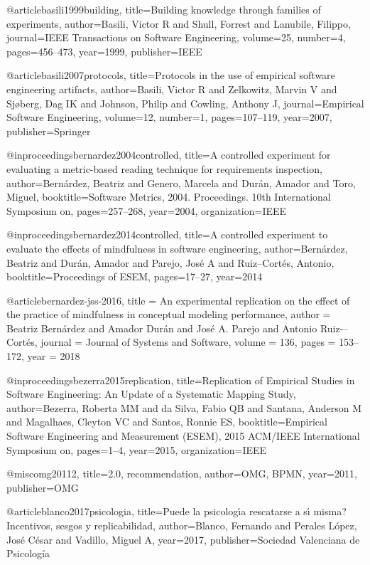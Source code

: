 @article{basili1999building,
  title={Building knowledge through families of experiments},
  author={Basili, Victor R and Shull, Forrest and Lanubile, Filippo},
  journal={IEEE Transactions on Software Engineering},
  volume={25},
  number={4},
  pages={456--473},
  year={1999},
  publisher={IEEE}
}


@article{basili2007protocols, 
  title={Protocols in the use of empirical software engineering artifacts},
  author={Basili, Victor R and Zelkowitz, Marvin V and Sj{\o}berg, Dag IK and Johnson, Philip and Cowling, Anthony J},
  journal={Empirical Software Engineering},
  volume={12},
  number={1},
  pages={107--119},
  year={2007},
  publisher={Springer}
}


@inproceedings{bernardez2004controlled,
  title={A controlled experiment for evaluating a metric-based reading technique for requirements inspection},
  author={Bern{\'a}rdez, Beatriz and Genero, Marcela and Dur{\'a}n, Amador and Toro, Miguel},
  booktitle={Software Metrics, 2004. Proceedings. 10th International Symposium on},
  pages={257--268},
  year={2004},
  organization={IEEE}
}

@inproceedings{bernardez2014controlled,
  title={A controlled experiment to evaluate the effects of mindfulness in software engineering},
  author={Bern{\'a}rdez, Beatriz and Dur{\'a}n, Amador and Parejo, Jos{\'e} A and Ruiz--Cortés, Antonio},
  booktitle={Proceedings of ESEM},
  pages={17--27},
  year={2014}
}%

@article{bernardez-jss-2016,
  title = {An experimental replication on the effect of the practice of mindfulness in conceptual modeling performance},
  author = {Beatriz Bernárdez and Amador Durán and José A. Parejo and Antonio Ruiz-–Cortés},
  journal = {Journal of Systems and Software},
  volume = 136,
  pages = {153--172},
  year = 2018
}

@inproceedings{bezerra2015replication,
  title={Replication of Empirical Studies in Software Engineering: An Update of a Systematic Mapping Study},
  author={Bezerra, Roberta MM and da Silva, Fabio QB and Santana, Anderson M and Magalhaes, Cleyton VC and Santos, Ronnie ES},
  booktitle={Empirical Software Engineering and Measurement (ESEM), 2015 ACM/IEEE International Symposium on},
  pages={1--4},
  year={2015},
  organization={IEEE}
}


@misc{omg20112,
  title={2.0, recommendation},
  author={OMG, BPMN},
  year={2011},
  publisher={OMG}
}

@article{blanco2017psicologia,
  title={Puede la psicolog{\'\i}a rescatarse a s{\'\i} misma? Incentivos, sesgos y replicabilidad},
  author={Blanco, Fernando and Perales López, José César and Vadillo, Miguel A},
  year={2017},
  publisher={Sociedad Valenciana de Psicología}
}

